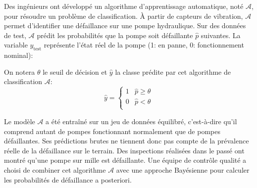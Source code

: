 \documentclass[solutions]{../exercices}
\begin{document}
	\begin{exercice}
		Des ingénieurs ont développé un algorithme d'apprentissage automatique, noté $\mathcal{A}$, pour résoudre un problème de classification. \`A partir de capteurs de vibration, $\mathcal{A}$ permet d'identifier une défaillance sur une pompe hydraulique. Sur des données de test, $\mathcal{A}$ prédit les probabilités que la pompe soit défaillante $\hat{p}$ suivantes. La variable $y_{\text{test}}$ représente l'état réel de la pompe (1: en panne, 0: fonctionnement nominal):

		\begin{table}[h]
			\centering
		\end{table}

		On notera $\theta$ le seuil de décision et $\hat{y}$ la classe prédite par cet algorithme de classification $\mathcal{A}$:
		\begin{equation}
			\hat{y} = \begin{cases}
					1 & \hat{p} \ge \theta \\
					0 & \hat{p} < \theta \\
				\end{cases}
			\nonumber
		\end{equation}

		Le modèle $\mathcal{A}$ a été entraîné sur un jeu de données équilibré, c'est-à-dire qu'il comprend autant de pompes fonctionnant normalement que de pompes défaillantes. Ses prédictions brutes ne tiennent donc pas compte de la prévalence réelle de la défaillance sur le terrain. Des inspections réalisées dans le passé ont montré qu'une pompe sur mille est défaillante. Une équipe de contrôle qualité a choisi de combiner cet algorithme $\mathcal{A}$ avec une approche Bayésienne pour calculer les probabilités de défaillance a posteriori.


\end{exercice}
\end{document}
